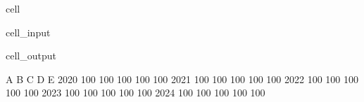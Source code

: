 \documentclass[letterpaper,10pt,english]{jupyterBook}
\begin{document}
\begin{sphinxuseclass}{cell}\begin{sphinxVerbatimInput}

\begin{sphinxuseclass}{cell_input}
\begin{sphinxVerbatim}[commandchars=\\\{\}]
  
       \PYG{p}{[}    \PYG{p}{]} 
       \PYG{p}{[}\PYG{p}{]}                                 
\end{sphinxVerbatim}

\end{sphinxuseclass}\end{sphinxVerbatimInput}
\begin{sphinxVerbatimOutput}

\begin{sphinxuseclass}{cell_output}
\begin{sphinxVerbatim}[commandchars=\\\{\}]
        A    B    C    D    E
2020  100  100  100  100  100
2021  100  100  100  100  100
2022  100  100  100  100  100
2023  100  100  100  100  100
2024  100  100  100  100  100
\end{sphinxVerbatim}

\end{sphinxuseclass}\end{sphinxVerbatimOutput}

\end{sphinxuseclass}
\end{document}
